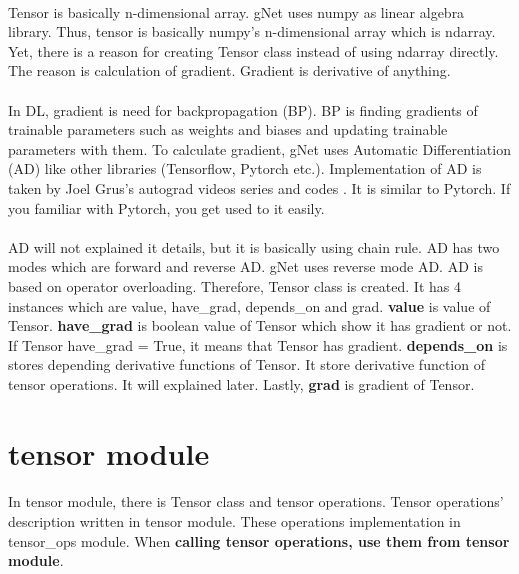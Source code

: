 \documentclass[12pt]{report}
\begin{document}
\paragraph{}
Tensor is basically n-dimensional array. gNet uses numpy as linear algebra library. Thus, tensor is basically numpy's n-dimensional array which is ndarray. Yet, there is a reason for creating Tensor class instead of using ndarray directly. The reason is calculation of gradient. Gradient is derivative of anything. 

\paragraph{}
In DL, gradient is need for backpropagation (BP). BP is finding gradients of trainable parameters such as weights and biases and updating trainable parameters with them. To calculate gradient, gNet uses Automatic Differentiation (AD) \cite{AD_savine} like other libraries (Tensorflow, Pytorch etc.). Implementation of AD is taken by Joel Grus's autograd videos series and codes \cite{Joel_Grus}. It is similar to Pytorch. If you familiar with Pytorch, you get used to it easily. 

\paragraph{} 
AD will not explained it details, but it is basically using chain rule. AD has two modes which are forward and reverse AD. gNet uses reverse mode AD. AD is based on operator overloading. Therefore, Tensor class is created. It has 4 instances which are value, have\_grad, depends\_on and grad. \textbf{value} is value of Tensor. \textbf{have\_grad} is boolean value of Tensor which show it has gradient or not. If Tensor have\_grad = True, it means that Tensor has gradient. \textbf{depends\_on} is stores depending derivative functions of Tensor. It store derivative function of tensor operations. It will explained later. Lastly, \textbf{grad} is gradient of Tensor.

\section{tensor module}
\paragraph{}
In tensor module, there is Tensor class and tensor operations. Tensor operations' description written in tensor module. These operations implementation in tensor\_ops module. When \textbf{calling tensor operations, use them from tensor module}.
\end{document}
